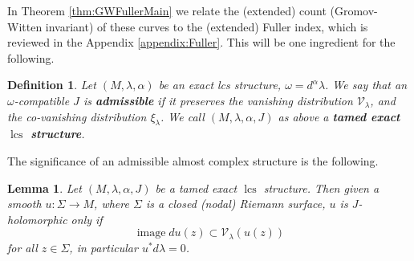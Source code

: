 \documentclass{amsart}
\numberwithin{equation}{section}
\newtheorem{lemma}[equation]{Lemma}
\newtheorem{definition}[equation]{Definition}
\theoremstyle{definition}
\theoremstyle{remark}
\DeclareMathOperator{\image}{\mathrm{image}}
\DeclareMathOperator{\lcs}{lcs}
\begin{document}
In Theorem \ref{thm:GWFullerMain} we relate the (extended) count (Gromov-Witten invariant) of these curves to the (extended) Fuller index, which is reviewed in the Appendix \ref{appendix:Fuller}. This will be one ingredient for the following.
\begin{definition} \label{def:admissible} Let $(M,\lambda, \alpha)$ be an exact lcs structure, $\omega =  d ^{\alpha} \lambda $. We say that an $\omega$-compatible $J$ is \textbf{\emph{admissible}} if it preserves the vanishing distribution $\mathcal{V} _{\lambda} $,     
and the co-vanishing distribution $\xi _{\lambda} $. We call $(M, \lambda, \alpha, J)$ as above a \textbf{\emph{tamed exact $\lcs$ structure}}. 
\end{definition}
The significance of an admissible almost complex structure is the following.
\begin{lemma} \label{lemma:calibrated} Let $(M,\lambda,\alpha,J)$ be a tamed exact $\lcs$ structure.  Then given a smooth $u: \Sigma \to M$, where $\Sigma$ is a closed (nodal) Riemann surface, $u$ is $J$-holomorphic only if 
$$\image du (z) \subset \mathcal{V} _{\lambda} (u (z)) $$ for all $z \in \Sigma$,
   in particular $u ^{*} d\lambda =0$. 
\end{lemma}
\end{document}
